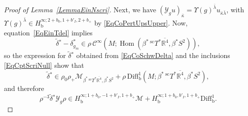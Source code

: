 \documentclass[reqno,11pt,letterpaper]{amsart}
\numberwithin{equation}{section}
\numberwithin{figure}{section}
\theoremstyle{definition}
\theoremstyle{remark}
\newcommand{\mc}{\mathcal}
\newcommand{\cC}{\mc C}
\newcommand{\cM}{\mc M}
\newcommand{\ms}{\mathscr}
\newcommand{\sY}{\ms Y}
\newcommand{\R}{\mathbb{R}}
\newcommand{\Hom}{\operatorname{Hom}}
\newcommand{\Ups}{\Upsilon}
\newcommand{\ol}{\overline}
\newcommand{\wt}{\widetilde}
\newcommand{\bop}{{\mathrm{b}}}
\newcommand{\scl}{{\mathrm{sc}}}
\newcommand{\Diff}{\mathrm{Diff}}
\newcommand{\Diffb}{\Diff_\bop}
\newcommand{\Tsc}{{}^{\scl}T}
\newcommand{\CI}{\cC^\infty}
\newcommand{\Hb}{H_{\bop}}
\newcommand{\tdel}{\wt{\delta}{}}
\newcommand{\usref}[1]{{\upshape\ref{#1}}}
\begin{document}
\begin{proof}[Proof of Lemma~\usref{LemmaEinNscri}]
  Next, we have $(\sY_g u)_{\bar\kappa}=\Ups(g)^{\bar\lambda}u_{\bar\kappa\bar\lambda}$, with $\Ups(g)^{\bar\lambda}\in\Hb^{\infty;2+b_0,1+b'_I,2+b_+}$ by \eqref{EqCoPertUpsUpper}. Now, equation~\eqref{EqEinTdel} implies
  \begin{equation}
  \label{EqEinNscriTdeldiff}
    \tdel^*-\delta_{g_m}^* \in \rho\,\CI(M;\Hom(\beta^*\,\Tsc^*\ol{\R^4},\beta^*S^2)),
  \end{equation}
  so the expression for $\tdel^*$ obtained from \eqref{EqCoSchwDelta} and the inclusions \eqref{EqCptScriNull} show that
  \begin{equation}
  \label{EqEinNscriTdel}
    \tdel^*\in \rho_0\rho_+\cM_{\beta^*\,\Tsc^*\ol{\R^4},\beta^*S^2} + \rho\,\Diffb^1(M;\beta^*\,\Tsc^*\ol{\R^4},\beta^*S^2),
  \end{equation}
  and therefore
  \begin{equation}
  \label{EqEinNscrisY}
    \rho^{-3}\tdel^*\sY_g\rho \in \Hb^{\infty;1+b_0,-1+b'_I,1+b_+}\cM + \Hb^{\infty;1+b_0,b'_I,1+b_+}\Diffb^1.
  \end{equation}


\end{proof}
\end{document}
